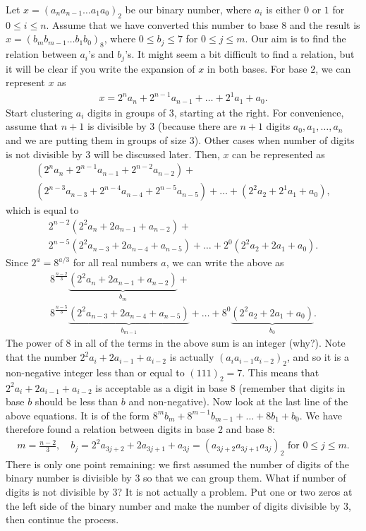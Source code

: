 \documentclass{subfile}
\begin{document}
	Let $x = (a_{n}a_{n-1}\dots a_1a_0)_2$ be our binary number, where $a_i$ is either $0$ or $1$ for $0\leq i \leq n$. Assume that we have converted this number to base $8$ and the result is $x = (b_{m}b_{m-1}\dots b_1b_0)_8$, where $0\leq b_j \leq 7$ for $0 \leq j \leq m$. Our aim is to find the relation between $a_i$'s and $b_j$'s. It might seem a bit difficult to find a relation, but it will be clear if you write the expansion of $x$ in both bases. For base $2$, we can represent $x$ as
	\begin{align*}
		x =  2^{n} a_{n} + 2^{n-1} a_{n-1} + \dots + 2^1a_1 + a_0.
	\end{align*}
	Start clustering $a_i$ digits in groups of $3$, starting at the right. For convenience, assume that $n+1$ is divisible by $3$ (because there are $n+1$ digits $a_0, a_1, \dots, a_n$ and we are putting them in groups of size $3$). Other cases when number of digits is not divisible by $3$ will be discussed later. Then, $x$ can be represented as
	\begin{multline*}
		 \left(2^{n} a_{n} + 2^{n-1} a_{n-1} + 2^{n-2} a_{n-2} \right) + \\ \left(2^{n-3}  a_{n-3} + 2^{n-4} a_{n-4} + 2^{n-5} a_{n-5} \right) +\dots + \left( 2^2a_2 + 2^1a_1 + a_0 \right),
	\end{multline*}
	which is equal to
	\begin{multline*}
		2^{n-2}\left(2^2 a_{n} + 2 a_{n-1} + a_{n-2} \right) + \\ 2^{n-5} \left(2^2 a_{n-3}  +  2 a_{n-4} + a_{n-5} \right)+  \dots + 2^0\left( 2^2a_2 + 2a_1 + a_0 \right).
	\end{multline*}
	Since $2^{a}=8^{a/3}$ for all real numbers $a$, we can write the above as
	\begin{multline*}
   		8^{\frac{n-2}{3}} \underbrace{\left(2^2 a_{n} + 2 a_{n-1} + a_{n-2} \right)}_{b_m} + \\ 8^{\frac{n-5}{3}}  \underbrace{\left(2^2 a_{n-3} + 2 a_{n-4} + a_{n-5} \right)}_{b_{m-1}} + \dots + 8^0 \underbrace{\left( 2^2a_2 + 2a_1 + a_0 \right)}_{b_0}.
	\end{multline*}
	The power of $8$ in all of the terms in the above sum is an integer (why?). Note that the number $2^2 a_i + 2 a_{i-1} + a_{i-2}$ is actually $(a_{i}a_{i-1}a_{i-2})_2$, and so it is a non-negative integer less than or equal to $(111)_2 = 7$. This means that $2^2 a_i + 2 a_{i-1} + a_{i-2}$ is acceptable as a digit in base $8$ (remember that digits in base $b$ should be less than $b$ and non-negative). Now look at the last line of the above equations. It is of the form $8^m b_m + 8^{m-1}b_{m-1} + \dots + 8b_1+b_0$. We have therefore found a relation between digits in base $2$ and base $8$:
	\begin{align*}
		m=\frac{n-2}{3}, \quad b_j = 2^2a_{3j+2} + 2a_{3j+1} + a_{3j} = (a_{3j+2}a_{3j+1}a_{3j})_2 \text{ for } 0 \leq j \leq m.
	\end{align*}
	There is only one point remaining: we first assumed the number of digits of the binary number is divisible by $3$ so that we can group them. What if number of digits is not divisible by $3$? It is not actually a problem. Put one or two zeros at the left side of the binary number and make the number of digits divisible by $3$, then continue the process.
\end{document}
